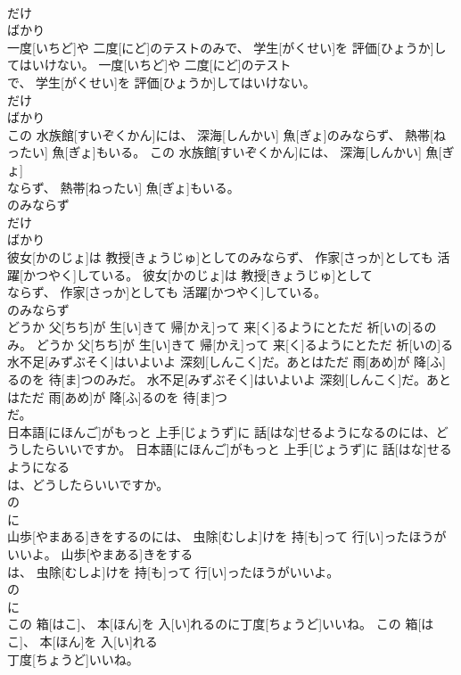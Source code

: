 \documentclass[8pt]{extreport}
\begin{document}
\begin{CJK}{UTF8}{min}
\\	だけ 
\\	ばかり 
\\	一度[いちど]や 二度[にど]のテストのみで、 学生[がくせい]を 評価[ひょうか]してはいけない。	一度[いちど]や 二度[にど]のテスト
\\	で、 学生[がくせい]を 評価[ひょうか]してはいけない。	
\\	だけ 
\\	ばかり 
\\	この 水族館[すいぞくかん]には、 深海[しんかい] 魚[ぎょ]のみならず、 熱帯[ねったい] 魚[ぎょ]もいる。	この 水族館[すいぞくかん]には、 深海[しんかい] 魚[ぎょ]
\\	ならず、 熱帯[ねったい] 魚[ぎょ]もいる。	
\\	のみならず
\\	だけ 
\\	ばかり 
\\	彼女[かのじょ]は 教授[きょうじゅ]としてのみならず、 作家[さっか]としても 活躍[かつやく]している。	彼女[かのじょ]は 教授[きょうじゅ]として
\\	ならず、 作家[さっか]としても 活躍[かつやく]している。	
\\	のみならず
\\	どうか 父[ちち]が 生[い]きて 帰[かえ]って 来[く]るようにとただ 祈[いの]るのみ。	どうか 父[ちち]が 生[い]きて 帰[かえ]って 来[く]るようにとただ 祈[いの]る
\\	水不足[みずぶそく]はいよいよ 深刻[しんこく]だ。あとはただ 雨[あめ]が 降[ふ]るのを 待[ま]つのみだ。	水不足[みずぶそく]はいよいよ 深刻[しんこく]だ。あとはただ 雨[あめ]が 降[ふ]るのを 待[ま]つ
\\	だ。	
\\	日本語[にほんご]がもっと 上手[じょうず]に 話[はな]せるようになるのには、どうしたらいいですか。	日本語[にほんご]がもっと 上手[じょうず]に 話[はな]せるようになる
\\	は、どうしたらいいですか。	
\\	の 
\\	に
\\	山歩[やまある]きをするのには、 虫除[むしよ]けを 持[も]って 行[い]ったほうがいいよ。	山歩[やまある]きをする
\\	は、 虫除[むしよ]けを 持[も]って 行[い]ったほうがいいよ。	
\\	の 
\\	に
\\	この 箱[はこ]、 本[ほん]を 入[い]れるのに丁度[ちょうど]いいね。	この 箱[はこ]、 本[ほん]を 入[い]れる
\\	丁度[ちょうど]いいね。	

\end{CJK}
\end{document}
